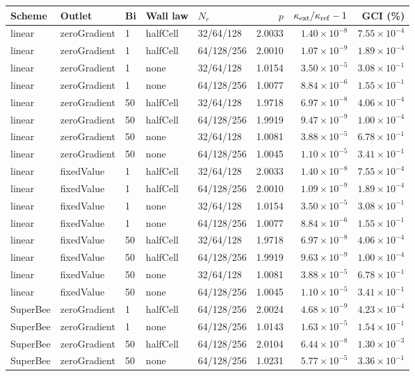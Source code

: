 \begin{tabular}{lllllrrr}
\toprule
Scheme & Outlet & Bi & Wall law & $N_r$ & $p$ & $\kappa_{\rm ext}/\kappa_{\rm ref}-1$ & GCI (\%) \\
\midrule
linear & zeroGradient & 1 & halfCell & 32/64/128 & 2.0033 & $1.40\times10^{-8}$ & $7.55\times10^{-4}$ \\
linear & zeroGradient & 1 & halfCell & 64/128/256 & 2.0010 & $1.07\times10^{-9}$ & $1.89\times10^{-4}$ \\
linear & zeroGradient & 1 & none & 32/64/128 & 1.0154 & $3.50\times10^{-5}$ & $3.08\times10^{-1}$ \\
linear & zeroGradient & 1 & none & 64/128/256 & 1.0077 & $8.84\times10^{-6}$ & $1.55\times10^{-1}$ \\
linear & zeroGradient & 50 & halfCell & 32/64/128 & 1.9718 & $6.97\times10^{-8}$ & $4.06\times10^{-4}$ \\
linear & zeroGradient & 50 & halfCell & 64/128/256 & 1.9919 & $9.47\times10^{-9}$ & $1.00\times10^{-4}$ \\
linear & zeroGradient & 50 & none & 32/64/128 & 1.0081 & $3.88\times10^{-5}$ & $6.78\times10^{-1}$ \\
linear & zeroGradient & 50 & none & 64/128/256 & 1.0045 & $1.10\times10^{-5}$ & $3.41\times10^{-1}$ \\
linear & fixedValue & 1 & halfCell & 32/64/128 & 2.0033 & $1.40\times10^{-8}$ & $7.55\times10^{-4}$ \\
linear & fixedValue & 1 & halfCell & 64/128/256 & 2.0010 & $1.09\times10^{-9}$ & $1.89\times10^{-4}$ \\
linear & fixedValue & 1 & none & 32/64/128 & 1.0154 & $3.50\times10^{-5}$ & $3.08\times10^{-1}$ \\
linear & fixedValue & 1 & none & 64/128/256 & 1.0077 & $8.84\times10^{-6}$ & $1.55\times10^{-1}$ \\
linear & fixedValue & 50 & halfCell & 32/64/128 & 1.9718 & $6.97\times10^{-8}$ & $4.06\times10^{-4}$ \\
linear & fixedValue & 50 & halfCell & 64/128/256 & 1.9919 & $9.63\times10^{-9}$ & $1.00\times10^{-4}$ \\
linear & fixedValue & 50 & none & 32/64/128 & 1.0081 & $3.88\times10^{-5}$ & $6.78\times10^{-1}$ \\
linear & fixedValue & 50 & none & 64/128/256 & 1.0045 & $1.10\times10^{-5}$ & $3.41\times10^{-1}$ \\
SuperBee & zeroGradient & 1 & halfCell & 64/128/256 & 2.0024 & $4.68\times10^{-9}$ & $4.23\times10^{-4}$ \\
SuperBee & zeroGradient & 1 & none & 64/128/256 & 1.0143 & $1.63\times10^{-5}$ & $1.54\times10^{-1}$ \\
SuperBee & zeroGradient & 50 & halfCell & 64/128/256 & 2.0104 & $6.44\times10^{-8}$ & $1.30\times10^{-3}$ \\
SuperBee & zeroGradient & 50 & none & 64/128/256 & 1.0231 & $5.77\times10^{-5}$ & $3.36\times10^{-1}$ \\
\bottomrule
\end{tabular}
